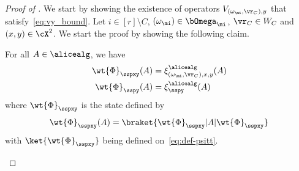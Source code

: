 \begin{proof}[Proof of ]
	We start by showing the existence of operators $V_{(\omega_{\mi}, \vr_C),y}$ that satisfy~\eqref{eq:vy_bound}.  Let $i \in [r] \setminus C$, $(\omega_{\mi}) \in \bOmega_{\mi}$, $\vr_C \in W_C$ and $(x,y) \in \cX^2$. We start the proof by showing the following claim. 
	
	\begin{claim}
		\label{clm:xi-purification}
		For all $A \in \alicealg$, we have
		\begin{align*}
			\wt{\Phi}_{\sspxy}(A) &= \xi^{\alicealg}_{(\omega_\mi, \vr_C), x,y}(A) \\
			\wt{\Phi}_{\sspy}(A) &= \xi_\sspy^{\alicealg}(A)
		\end{align*}
		where $\wt{\Phi}_\sspxy$ is the state defined by
		\begin{equation*}
			\wt{\Phi}_\sspxy(A) = \braket{\wt{\Phi}_\sspxy| A |\wt{\Phi}_\sspxy}
		\end{equation*}
		with $\ket{\wt{\Phi}_\sspxy}$ being defined on~\eqref{eq:def-psitt}. 
	\end{claim}
	

\end{proof}
